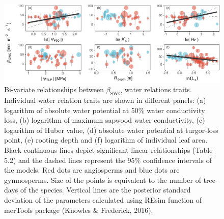 \documentclass[11pt,twoside]{reedthesis}
\begin{document}
\begin{figure}[hbt!]

{\centering \includegraphics[width=1\linewidth]{figure/CH5/Figure_5} 

}

\caption[Bi-variate relationships between $\beta_{\text{SWC}}$ water relations traits.]{Bi-variate relationships between \(\beta_{\text{SWC}}\)
water relations traits. Individual water relation traits are shown in
different panels: (a) logarithm of absolute water potential at 50\%
water conductivity loss, (b) logarithm of maximum sapwood water
conductivity, (c) logarithm of Huber value, (d) absolute water potential
at turgor-loss point, (e) rooting depth and (f) logarithm of individual
leaf area. Black continuous lines depict significant linear
relationships (Table 5.2) and the dashed lines represent the 95\%
confidence intervals of the models. Red dots are angiosperms and blue
dots are gymnosperms. Size of the points is equivalent to the number of
tree-days of the species. Vertical lines are the posterior standard
deviation of the parameters calculated using REsim function of merTools
package (Knowles \& Frederick, 2016).}\label{fig:ch5fig5}
\end{figure}
\end{document}
